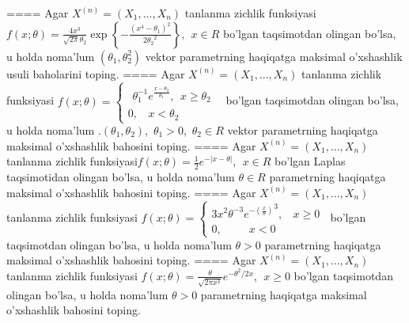 ====
Agar \(X^{(n)} = \left( X_{1},...,X_{n} \right)\) tanlanma zichlik funksiyasi\(f(x;\theta) = \frac{4x^{3}}{\sqrt{2\pi}\theta_{2}}\exp\left\{ - \frac{\left( x^{4} - \theta_{1} \right)^{2}}{2{\theta_{2}}^{2}} \right\},\ \ x \in R\) bo'lgan taqsimotdan olingan bo'lsa, u holda noma'lum \(\left( \theta_{1},\theta_{2}^{2} \right)\) vektor parametrning haqiqatga maksimal o'xshashlik usuli baholarini toping.
====
Agar \(X^{(n)} = \left( X_{1},...,X_{n} \right)\) tanlanma zichlik funksiyasi \(f(x;\theta) = \left\{ \begin{array}{r}
\begin{matrix}
\theta_{1}^{- 1}e^{\frac{x - \theta_{2}}{\theta_{1}}},\ \ x \geq \theta_{2}
\end{matrix} \\
0,\ \ \ \ x < \theta_{2}
\end{array} \right.\ \) bo'lgan taqsimotdan olingan bo'lsa, u holda noma'lum \(.\left( \theta_{1},\theta_{2} \right),\) \(\theta_{1} > 0,\) \(\theta_{2} \in R\) vektor parametrning haqiqatga maksimal o'xshashlik bahosini toping.
====
Agar \(X^{(n)} = \left( X_{1},...,X_{n} \right)\) tanlanma zichlik funksiyasi\(f(x;\theta) = \frac{1}{2}e^{- |x - \theta|},\ \ x \in R\) bo'lgan Laplas taqsimotidan olingan bo'lsa, u holda noma'lum \(\theta \in R\) parametrning haqiqatga maksimal o'xshashlik bahosini toping.
====
Agar \(X^{(n)} = \left( X_{1},...,X_{n} \right)\) tanlanma zichlik funksiyasi \(f(x;\theta) = \left\{ \begin{array}{r}
3x^{2}\theta^{- 3}{e^{- \left( \frac{x}{\theta} \right)}}^{3},\ \ \ \ x \geq 0 \\
0,\ \ \ \ \ \ \ \ \ \ \ x < 0
\end{array} \right.\ \) bo'lgan taqsimotdan olingan bo'lsa, u holda noma'lum \(\theta > 0\) parametrning haqiqatga maksimal o'xshashlik bahosini toping.
====
Agar \(X^{(n)} = \left( X_{1},...,X_{n} \right)\) tanlanma zichlik funksiyasi \(f(x;\theta) = \frac{\theta}{\sqrt{2\pi x^{3}}}e^{- \theta^{2}/2x},\ \ x \geq 0\) bo'lgan taqsimotdan olingan bo'lsa, u holda noma'lum \(\theta > 0\) parametrning haqiqatga maksimal o'xshashlik bahosini toping.
